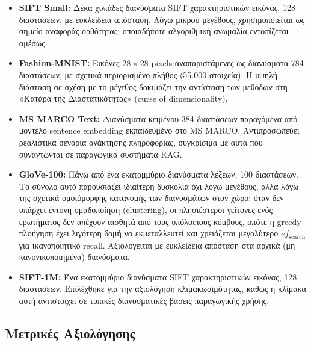 \documentclass[12pt,a4paper]{article}
\begin{document}
\begin{itemize}
    \item \textbf{SIFT Small:} Δέκα χιλιάδες διανύσματα SIFT χαρακτηριστικών εικόνας, 128 διαστάσεων, με ευκλείδεια απόσταση. Λόγω μικρού μεγέθους, χρησιμοποιείται ως σημείο αναφοράς ορθότητας: οποιαδήποτε αλγοριθμική ανωμαλία εντοπίζεται αμέσως.

    \item \textbf{Fashion-MNIST:} Εικόνες $28 \times 28$ pixels αναπαριστάμενες ως διανύσματα 784 διαστάσεων, με σχετικά περιορισμένο πλήθος (55.000 στοιχεία). Η υψηλή διάσταση σε σχέση με το μέγεθος δοκιμάζει την αντίσταση των μεθόδων στη «Κατάρα της Διαστατικότητας» (curse of dimensionality).

    \item \textbf{MS MARCO Text:} Διανύσματα κειμένου 384 διαστάσεων παραγόμενα από μοντέλο sentence embedding εκπαιδευμένο στο MS MARCO. Αντιπροσωπεύει ρεαλιστικά σενάρια ανάκτησης πληροφορίας, συγκρίσιμα με αυτά που συναντώνται σε παραγωγικά συστήματα RAG.

    \item \textbf{GloVe-100:} Πάνω από ένα εκατομμύριο διανύσματα λέξεων, 100 διαστάσεων. Το σύνολο αυτό παρουσιάζει ιδιαίτερη δυσκολία όχι λόγω μεγέθους, αλλά λόγω της σχετικά ομοιόμορφης κατανομής των διανυσμάτων στον χώρο: όταν δεν υπάρχει έντονη ομαδοποίηση (clustering), οι πλησιέστεροι γείτονες ενός ερωτήματος δεν απέχουν αισθητά από τους υπόλοιπους κόμβους, οπότε η greedy πλοήγηση έχει λιγότερη δομή να εκμεταλλευτεί και χρειάζεται μεγαλύτερο $ef_{\text{search}}$ για ικανοποιητικό recall. Αξιολογείται με ευκλείδεια απόσταση στα αρχικά (μη κανονικοποιημένα) διανύσματα.

    \item \textbf{SIFT-1M:} Ένα εκατομμύριο διανύσματα SIFT χαρακτηριστικών εικόνας, 128 διαστάσεων. Επιλέχθηκε για την αξιολόγηση κλιμακωσιμότητας, καθώς η κλίμακα αυτή αντιστοιχεί σε τυπικές διανυσματικές βάσεις παραγωγικής χρήσης.
\end{itemize}

\subsection{Μετρικές Αξιολόγησης}
\end{document}
